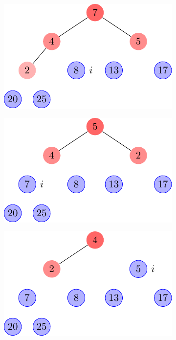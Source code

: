 \begin{description}
\begin{ex}
\begin{figure}[t]
\begin{subfigure}[t]{.30\textwidth}
          \caption{}\label{fig:6_4-1_6}
        \end{subfigure}
        \begin{subfigure}[t]{.30\textwidth}
          \centering
          \includegraphics[scale=0.8]{img/6_4-1/6_4-1_7}
          \caption{}\label{fig:6_4-1_7}
        \end{subfigure}
        \begin{subfigure}[t]{.30\textwidth}
          \centering
          \includegraphics[scale=0.8]{img/6_4-1/6_4-1_8}
          \caption{}\label{fig:6_4-1_8}
        \end{subfigure}
        \begin{subfigure}[t]{.30\textwidth}
          \centering
          \includegraphics[scale=0.8]{img/6_4-1/6_4-1_9}
          \caption{}\label{fig:6_4-1_9}
        \end{subfigure}
        \begin{subfigure}[t]{.30\textwidth}

\end{subfigure}
\end{figure}
\end{ex}
\end{description}
